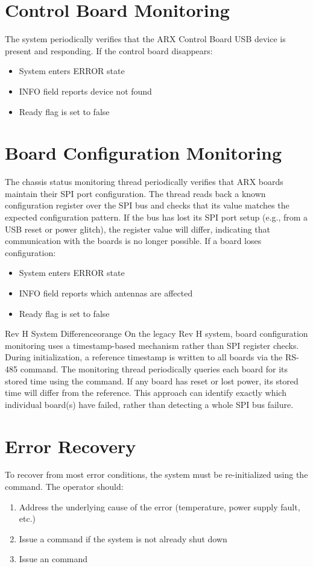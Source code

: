 \section{Control Board Monitoring}

The system periodically verifies that the ARX Control Board USB device is present and responding. If the control board disappears:
\begin{itemize}
    \item System enters ERROR state
    \item INFO field reports device not found
    \item Ready flag is set to false
\end{itemize}

\section{Board Configuration Monitoring}

The chassis status monitoring thread periodically verifies that ARX boards maintain their SPI port configuration. The thread reads back a known configuration register over the SPI bus and checks that its value matches the expected configuration pattern. If the bus has lost its SPI port setup (e.g., from a USB reset or power glitch), the register value will differ, indicating that communication with the boards is no longer possible. If a board loses configuration:
\begin{itemize}
    \item System enters ERROR state
    \item INFO field reports which antennas are affected
    \item Ready flag is set to false
\end{itemize}

\begin{calloutBox}{Rev H System Difference}{orange}
On the legacy Rev H system, board configuration monitoring uses a timestamp-based mechanism rather than SPI register checks. During initialization, a reference timestamp is written to all boards via the RS-485  command. The monitoring thread periodically queries each board for its stored time using the  command. If any board has reset or lost power, its stored time will differ from the reference. This approach can identify exactly which individual board(s) have failed, rather than detecting a whole SPI bus failure.
\end{calloutBox}

\section{Error Recovery}

To recover from most error conditions, the system must be re-initialized using the  command. The operator should:
\begin{enumerate}
    \item Address the underlying cause of the error (temperature, power supply fault, etc.)
    \item Issue a  command if the system is not already shut down
    \item Issue an  command
\end{enumerate}
